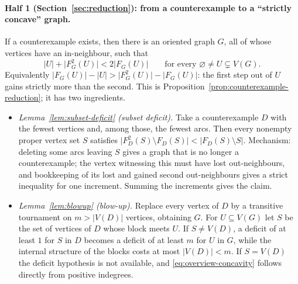 \documentclass[11pt]{article}
\theoremstyle{remark}
\newcommand{\abs}[1]{\lvert #1\rvert}
\begin{document}
\paragraph{Half 1 (Section~\ref{sec:reduction}): from a counterexample to a
``strictly concave'' graph.}
If a counterexample exists, then there is an oriented graph $G$, all of
whose vertices have an in-neighbour, such that
\begin{equation}\label{eq:overview-concavity}
 \abs{U}+\abs{F_G^2(U)}<2\abs{F_G(U)}
 \qquad\text{for every }\varnothing\ne U\subsetneq V(G).
\end{equation}
Equivalently $\abs{F_G(U)}-\abs U>\abs{F_G^2(U)}-\abs{F_G(U)}$: the first
step out of $U$ gains strictly more than the second. This is
Proposition~\ref{prop:counterexample-reduction}; it has two ingredients.
\begin{itemize}[leftmargin=2em]
\item \emph{Lemma~\ref{lem:subset-deficit} (subset deficit).} Take a
counterexample $D$ with the fewest vertices and, among those, the fewest
arcs. Then every nonempty proper vertex set $S$ satisfies
$\abs{F_D^2(S)\setminus F_D(S)}<\abs{F_D(S)\setminus S}$.
Mechanism: deleting some arcs leaving $S$ gives a graph that is no longer a
counterexample; the vertex witnessing this must have lost out-neighbours,
and bookkeeping of its lost and gained second out-neighbours gives a strict
inequality for one increment. Summing the increments gives the claim.
\item \emph{Lemma~\ref{lem:blowup} (blow-up).} Replace every vertex of $D$ by
a transitive tournament on $m>\abs{V(D)}$ vertices, obtaining $G$. For
$U\subseteq V(G)$ let $S$ be the set of vertices of $D$ whose block meets
$U$. If $S\ne V(D)$, a deficit of at least $1$ for $S$ in $D$ becomes a
deficit of at least $m$ for $U$ in $G$, while the internal structure of the
blocks costs at most $\abs{V(D)}<m$. If $S=V(D)$ the deficit hypothesis is
not available, and \eqref{eq:overview-concavity} follows directly from
positive indegrees.
\end{itemize}
\end{document}
